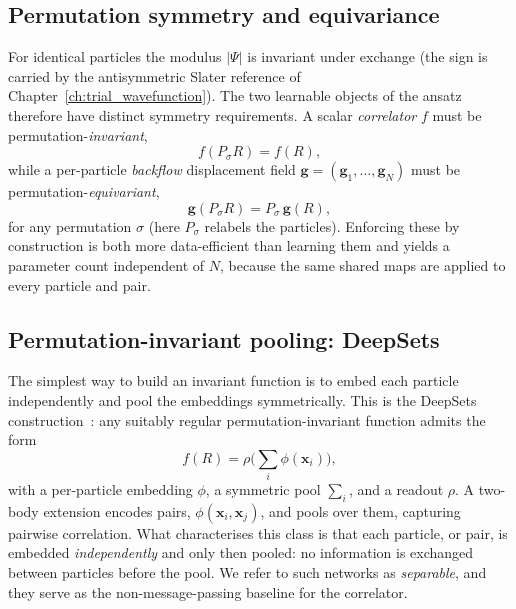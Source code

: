 \subsection{Permutation symmetry and equivariance}
For identical particles the modulus $|\Psi|$ is invariant under exchange (the sign is
carried by the antisymmetric Slater reference of Chapter~\ref{ch:trial_wavefunction}).
The two learnable objects of the ansatz therefore have distinct symmetry requirements.
A scalar \emph{correlator} $f$ must be permutation-\emph{invariant},
\[
  f(P_\sigma R)=f(R),
\]
while a per-particle \emph{backflow} displacement field $\mathbf g=(\mathbf g_1,\dots,\mathbf g_N)$
must be permutation-\emph{equivariant},
\[
  \mathbf g(P_\sigma R)=P_\sigma\,\mathbf g(R),
\]
for any permutation $\sigma$ (here $P_\sigma$ relabels the particles). Enforcing these by
construction is both more data-efficient than learning them and yields a parameter count
independent of $N$, because the same shared maps are applied to every particle and pair.

\subsection{Permutation-invariant pooling: DeepSets}
The simplest way to build an invariant function is to embed each particle independently
and pool the embeddings symmetrically. This is the DeepSets
construction~\cite{Zaheer2017-DeepSets}: any suitably regular permutation-invariant
function admits the form
\[
  f(R)=\rho\!\Big(\textstyle\sum_i \phi(\mathbf x_i)\Big),
\]
with a per-particle embedding $\phi$, a symmetric pool $\sum_i$, and a readout $\rho$. A
two-body extension encodes pairs, $\phi(\mathbf x_i,\mathbf x_j)$, and pools over them,
capturing pairwise correlation. What characterises this class is that each particle, or pair, is embedded \emph{independently} and only then pooled: no information is exchanged
between particles before the pool. We refer to such networks as \emph{separable}, and
they serve as the non-message-passing baseline for the correlator.


